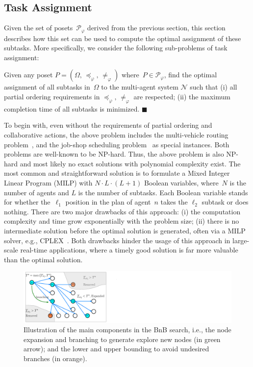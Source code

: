 \subsection{Task Assignment}\label{subsubsec:task-assignment}
Given the set of posets~$\mathcal{P}_{\varphi}$ derived from the previous
section, this section describes how this set can be used to compute
the optimal assignment of these subtasks. More specifically, we consider
the following sub-problems of task assignment:

\begin{problem}\label{problem:}
Given any poset $P=(\Omega,\, \preceq_{\varphi},\, \neq_{\varphi})$
where~$P\in \mathcal{P}_{\varphi}$,
find the optimal assignment of all subtasks in~$\Omega$ to the multi-agent system
$\mathcal{N}$ such that
(i) all partial ordering requirements in $\preceq_{\varphi},\, \neq_{\varphi}$ are
respected; (ii) the maximum completion time of all subtasks is minimized.
\hfill $\blacksquare$
\end{problem}

To begin with, even without the requirements of partial ordering
and collaborative actions, the above problem includes the multi-vehicle routing
problem~\cite{gini2017multi, khamis2015multi},
and the job-shop scheduling problem~\cite{brucker1994branch} as special instances.
Both problems are well-known to be NP-hard.
Thus, the above problem is also NP-hard and most likely no exact solutions with
polynomial complexity exist.
The most common and straightforward solution is to formulate a Mixed Integer
Linear Program (MILP) with $N \cdot L\cdot (L+1)$ Boolean variables, where~$N$ is the number
of agents and $L$ is the number of subtasks.
Each Boolean variable stands for whether the~$\ell_1$ position in the plan of
agent~$n$ takes the $\ell_2$ subtask or does nothing.
There are two major drawbacks of this approach:
(i) the computation complexity and time grow exponentially with the problem size;
(ii) there is no intermediate solution before the optimal solution is generated,
often via a MILP solver, e.g., CPLEX~\cite{lima2010ibm}.
Both drawbacks hinder the usage of this approach in large-scale real-time applications,
where a timely good solution is far more valuable than the optimal solution.
\begin{figure}[t!]
\centering
\includegraphics[width=0.9\linewidth]{figures/bnb_graph3.pdf}
\caption{
Illustration of the main components in the BnB search,
i.e., the node expansion and branching to generate explore new nodes (in green arrow);
and the lower and upper bounding to avoid undesired branches (in orange).}
\label{fig:bnb_search_logic}
\end{figure}

